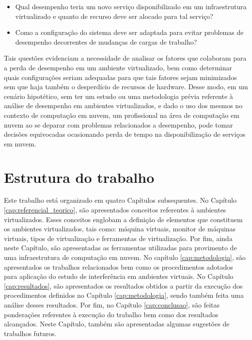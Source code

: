 \begin{itemize}
  \item Qual desempenho teria um novo serviço disponibilizado em um infraestrutura virtualizado e quanto de recurso deve ser alocado para tal serviço?

  \item Como a configuração do sistema deve ser adaptada para evitar problemas de desempenho decorrentes de mudanças de cargas de trabalho?
\end{itemize}


Tais questões evidenciam a necessidade de analisar os fatores que colaboram para a perda de desempenho em um ambiente virtualizado, bem como determinar quais configurações seriam adequadas para que tais fatores sejam minimizados sem que haja também o desperdício de recursos de hardware. Desse modo, em um cenário hipotético, sem ter um estudo ou uma metodologia prévia referente à análise de desempenho em ambientes virtualizados, e dado o uso dos mesmos no contexto de computação em nuvem, um profissional na área de computação em nuvem ao se deparar com problemas relacionados a desempenho, pode tomar decisões equivocadas ocasionando perda de tempo na disponibilização de serviços em nuvem.


\section{Estrutura do trabalho}
Este trabalho está organizado em quatro Capítulos subsequentes. No Capítulo \ref{cap:referencial_teorico}, são apresentados conceitos referentes à ambientes virtualizados. Esses conceitos englobam a definição de elementos que constituem os ambientes virtualizados, tais como: máquina virtuais, monitor de máquinas virtuais, tipos de virtualização e ferramentas de virtualização. Por fim, ainda neste Capítulo, são apresentadas as ferramentas utilizadas para provimento de uma infraestrutura de computação em nuvem. No capítulo \ref{cap:metodologia}, são apresentados os trabalhos relacionados bem como os procedimentos adotados para aplicação do estudo de interferência em ambientes virtuais. No Capítulo \ref{cap:resultados}, são apresentados os resultados obtidos a partir da execução dos procedimentos definidos no Capítulo \ref{cap:metodologia}, sendo também feita uma análise desses resultados. Por fim, no Capítulo \ref{cap:conclusao}, são feitas ponderações referentes à execução do trabalho bem como dos resultados alcançados. Neste Capítulo, também são apresentadas algumas sugestões de trabalhos futuros.


